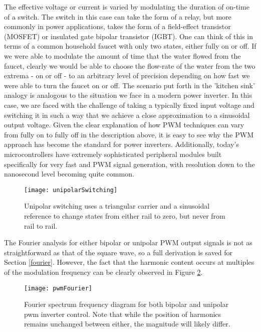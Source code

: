 The effective voltage or current is varied by modulating the duration of on-time of a switch. The switch in this case can take the form of a relay, but more commonly in power applications, takes the form of a field-effect transistor (MOSFET) or insulated gate bipolar transistor (IGBT). One can think of this in terms of a common household faucet with only two states, either fully on or off. If we were able to modulate the amount of time that the water flowed from the faucet, clearly we would be able to choose the flow-rate of the water from the two extrema - on or off - to an arbitrary level of precision depending on how fast we were able to turn the faucet on or off. The scenario put forth in the 'kitchen sink' analogy is analogous to the situation we face in a modern power inverter. In this case, we are faced with the challenge of taking a typically fixed input voltage and switching it in such a way that we achieve a close approximation to a sinusoidal output voltage. Given the clear explanation of how PWM techniques can vary from fully on to fully off in the description above, it is easy to see why the PWM approach has become the standard for power inverters. Additionally, today's microcontrollers have extremely sophisticated peripheral modules built specifically for very fast and PWM signal generation, with resolution down to the nanosecond level becoming quite common. 


\begin{figure}[h]
\centering
\texttt{[image: unipolarSwitching]}
\caption{Unipolar switching uses a triangular carrier and a sinusoidal reference to change states from either rail to zero, but never from rail to rail.\cite{inverterFourier}}
\label{unipolar}
\end{figure}

The Fourier analysis for either bipolar or unipolar PWM output signals is not as straightforward as that of the square wave, so a full derivation is saved for Section \ref{fourier}. However, the fact that the harmonic content occurs at multiples of the modulation frequency can be clearly observed in Figure \ref{pwmFourier}. 

\begin{figure}[h]
\centering
\texttt{[image: pwmFourier]}
\caption{Fourier spectrum frequency diagram for both bipolar and unipolar pwm inverter control. Note that while the position of harmonics remains unchanged between either, the magnitude will likely differ. \cite{inverterFourier}}
\label{pwmFourier}
\end{figure}

